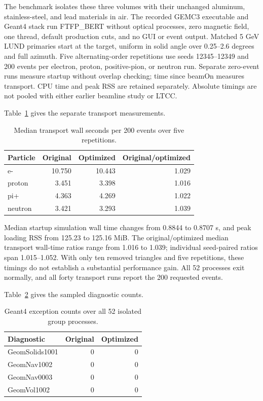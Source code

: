 The benchmark isolates these three volumes with their unchanged aluminum, stainless-steel, and lead
materials in air. The recorded GEMC3 executable and Geant4 stack run FTFP\_BERT without optical processes,
zero magnetic field, one thread, default production cuts, and no GUI or event output. Matched 5 GeV LUND
primaries start at the target, uniform in solid angle over 0.25--2.6 degrees and full azimuth. Five
alternating-order repetitions use seeds 12345--12349 and 200 events per electron, proton, positive-pion, or
neutron run. Separate zero-event runs measure startup without overlap checking; time since beamOn measures
transport. CPU time and peak RSS are retained separately. Absolute timings are not pooled with either
earlier beamline study or LTCC.

Table~\ref{tab:exit-timing} gives the separate transport measurements.

\begin{table}[htbp]
\centering
\caption{Median transport wall seconds per 200 events over five repetitions.}
\label{tab:exit-timing}
\begin{tabular}{lrrr}
\toprule
Particle & Original & Optimized & Original/optimized \\
\midrule
e- & 10.750 & 10.443 & 1.029 \\
proton & 3.451 & 3.398 & 1.016 \\
pi+ & 4.363 & 4.269 & 1.022 \\
neutron & 3.421 & 3.293 & 1.039 \\
\bottomrule
\end{tabular}
\end{table}

Median startup simulation wall time changes from 0.8844 to 0.8707 s, and peak loading RSS from 125.23 to
125.16 MiB. The original/optimized median transport wall-time ratios range from 1.016 to 1.039; individual
seed-paired ratios span 1.015--1.052. With only ten removed triangles and five repetitions, these timings do
not establish a substantial performance gain. All 52 processes exit normally, and all forty transport runs
report the 200 requested events.

Table~\ref{tab:exit-warnings} gives the sampled diagnostic counts.

\begin{table}[htbp]
\centering
\caption{Geant4 exception counts over all 52 isolated group processes.}
\label{tab:exit-warnings}
\begin{tabular}{lrr}
\toprule
Diagnostic & Original & Optimized \\
\midrule
GeomSolids1001 & 0 & 0 \\
GeomNav1002 & 0 & 0 \\
GeomNav0003 & 0 & 0 \\
GeomVol1002 & 0 & 0 \\
\bottomrule
\end{tabular}
\end{table}

